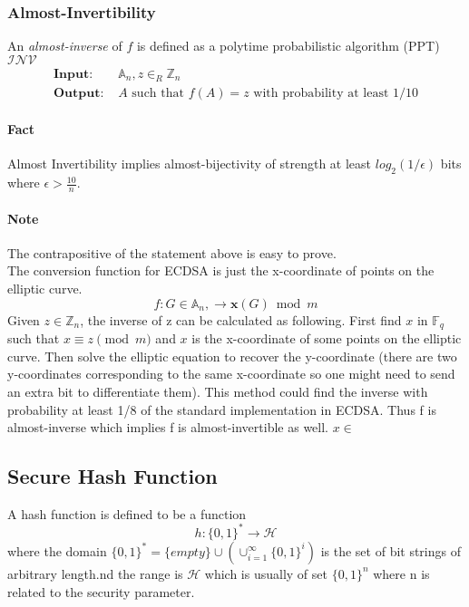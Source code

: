 \documentclass[18]{article}
\begin{document}
\subsubsection{Almost-Invertibility}
An \textit{almost-inverse} of $f$ is defined as a polytime probabilistic
algorithm (PPT) $\mathcal{INV}$
\begin{align*}
\textbf{Input: } &\mathbb{A}_n, z \in _R \mathbb{Z}_n \\
\textbf{Output: } &A \text{ such that } f(A)=z
\text{ with probability at least } 1/10
\end{align*}
\paragraph{Fact} Almost Invertibility implies almost-bijectivity of strength at least
$log_2(1/\epsilon)$ bits where $\epsilon > \frac{10}{n}$.
\paragraph{Note} The contrapositive of the statement above is easy to prove.
\\
The conversion function for ECDSA is just the x-coordinate of points on the elliptic curve.
\begin{equation*}
f: G \in \mathbb{A}_n, \to \mathbf{x}(G) \bmod m
\end{equation*}
Given $z \in \mathbb{Z}_n$, the inverse of z can be calculated as following.
First find $x$ in $\mathbb{F}_q$ such that $x \equiv z \pmod{m}$ and $x$ is the x-coordinate of some points on the elliptic curve. Then solve the elliptic equation to recover the y-coordinate (there are two y-coordinates corresponding to the same x-coordinate so one might need to send an extra bit to differentiate them).
This method could find the inverse with probability at least 1/8 of the standard implementation in ECDSA. Thus f is almost-inverse which implies f is almost-invertible as well.
$x \in $

\subsection{Secure Hash Function}
A hash function is defined to be a function
\begin{equation*}
h:\{0,1\}^* \to \mathcal{H}
\end{equation*}
where the domain $\{0,1\}^* = \{empty\} \cup (\cup_{i=1}^{\infty}\{0,1\}^i)$ is the set of bit strings of arbitrary length.nd the range is $\mathcal{H}$ which is usually of set $\{0,1\}^n$ where n is related to the security parameter.
\end{document}
